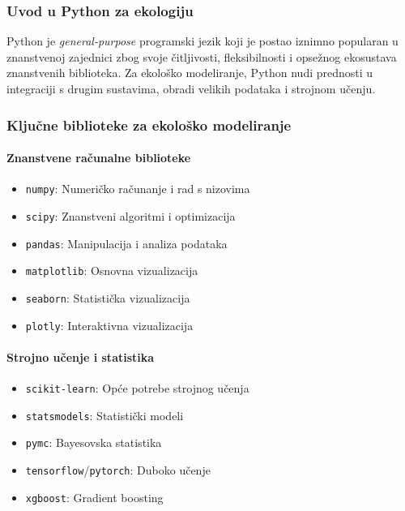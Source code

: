 \documentclass[11pt,oneside]{book}
\begin{document}
\subsubsection{Uvod u Python za ekologiju}

Python je \textit{general-purpose} programski jezik koji je postao iznimno popularan u znanstvenoj zajednici zbog svoje čitljivosti, fleksibilnosti i opsežnog ekosustava znanstvenih biblioteka. Za ekološko modeliranje, Python nudi prednosti u integraciji s drugim sustavima, obradi velikih podataka i strojnom učenju.

\subsubsection{Ključne biblioteke za ekološko modeliranje}

\paragraph{Znanstvene računalne biblioteke}

\begin{itemize}
	\item \texttt{numpy}: Numeričko računanje i rad s nizovima
	\item \texttt{scipy}: Znanstveni algoritmi i optimizacija
	\item \texttt{pandas}: Manipulacija i analiza podataka
	\item \texttt{matplotlib}: Osnovna vizualizacija
	\item \texttt{seaborn}: Statistička vizualizacija
	\item \texttt{plotly}: Interaktivna vizualizacija
\end{itemize}

\paragraph{Strojno učenje i statistika}

\begin{itemize}
	\item \texttt{scikit-learn}: Opće potrebe strojnog učenja
	\item \texttt{statsmodels}: Statistički modeli
	\item \texttt{pymc}: Bayesovska statistika
	\item \texttt{tensorflow}/\texttt{pytorch}: Duboko učenje
	\item \texttt{xgboost}: Gradient boosting
\end{itemize}
\end{document}
